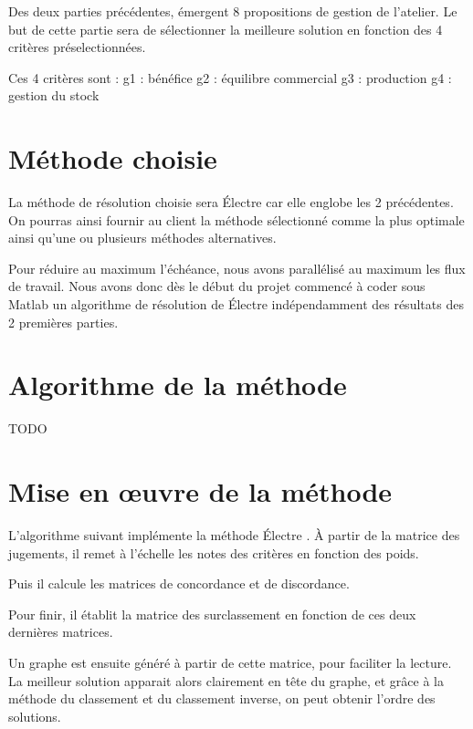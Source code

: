 
Des deux parties précédentes, émergent 8 propositions de gestion de l'atelier.
Le but de cette partie sera de sélectionner la meilleure solution en fonction des 4 critères préselectionnées.

Ces 4 critères sont :
g1 : bénéfice
g2 : équilibre commercial
g3 : production
g4 : gestion du stock

\section{Méthode choisie}

La méthode de résolution choisie sera Électre  car elle englobe les 2 précédentes.
On pourras ainsi fournir au client la méthode sélectionné comme la plus optimale ainsi qu'une ou plusieurs méthodes alternatives.

Pour réduire au maximum l'échéance, nous avons parallélisé au maximum les flux de travail.
Nous avons donc dès le début du projet commencé à coder sous Matlab un
algorithme de résolution de Électre  indépendamment des résultats des 2 premières parties.

\section{Algorithme de la méthode}

TODO

\section{Mise en œuvre de la méthode}
L'algorithme suivant implémente la méthode Électre . À partir de la matrice des jugements, il remet à l'échelle les notes des critères en fonction des poids.


Puis il calcule les matrices de concordance et de discordance.



Pour finir, il établit la matrice des surclassement en fonction de ces deux dernières matrices.


Un graphe est ensuite généré à partir de cette matrice, pour faciliter la lecture.
La meilleur solution apparait alors clairement en tête du graphe, et grâce à la méthode du classement et du classement inverse, on peut obtenir l'ordre des solutions.

